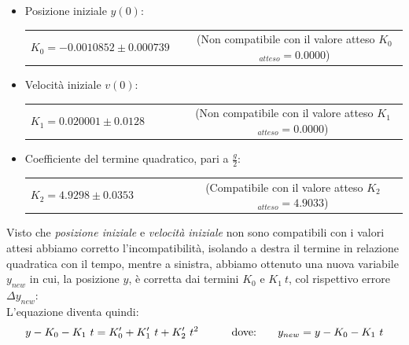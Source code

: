\documentclass[12pt, a4paper]{article}
\begin{document}
\renewcommand{\theenumii}{\roman{enumii}}  
\begin{itemize}
    \itemsep0em 
    
        \item Posizione iniziale $y(0)$:
        
        \begin{tabular}{ccc}
        {$K_0 = -0.0010852 \pm 0.000739$} & & \small{(Non compatibile con il valore atteso $K_{0}$ $_{atteso}= 0.0000$)}\\
        \end{tabular}
        
    \end{itemize}
    \begin{itemize}
        \item Velocità iniziale $v(0)$:\\
        \begin{tabular}{ccccc}
        {$K_1 =  0.020001 \pm 0.0128$} & & & & \small{(Non compatibile con il valore atteso $K_{1}$ $_{atteso} = 0.0000$)}\\
        \end{tabular}
        
    \end{itemize}
      \begin{itemize}
          \item Coefficiente del termine quadratico, pari a $\displaystyle{\frac{g}{2}}$:\\ 
          \begin{tabular}{cccccc}
              {$K_2 =  4.9298 \pm 0.0353$} & & & & &\small{(Compatibile con il valore atteso $K_{2}$ $_{atteso}= 4.9033$)}\\
          \end{tabular}
         
      \end{itemize}
    \bigskip
Visto che \textit{posizione iniziale} e \textit{velocità iniziale} non sono compatibili con i valori attesi abbiamo corretto l'incompatibilità, isolando a destra il termine in relazione  quadratica con il tempo, mentre a sinistra, abbiamo ottenuto una nuova variabile $y_{new}$ in cui, la posizione $y$, è corretta dai termini $K_0$ e $ K_1\ t$, col rispettivo errore $\Delta y_{new}$: \\
L'equazione diventa quindi:
\begin{equation*}
\begin{aligned}
  & & y - K_0 - K_1\ t = K_0'+K_1'\ t+K_{2}'\ t^2
  &\quad{} 
  \end{aligned}
  \begin{aligned}
  & &\text{dove:\phantom{.......}} y_{new} = y - K_0 - K_1\ t 
  &
  \end{aligned}
\end{equation*}
\end{document}

